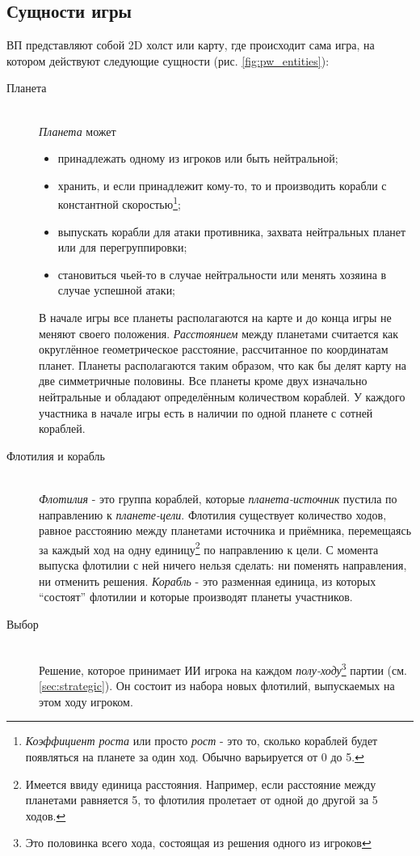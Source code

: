 \documentclass[12pt]{report}
\newenvironment{myItemize}{
	\begin{itemize}
  		\setlength{\itemsep}{1pt}
  		\setlength{\parskip}{0pt}
  		\setlength{\parsep}{0pt}
}{\end{itemize}}
\begin{document}
\subsection{Сущности игры}
ВП представляют собой 2D холст или карту, где происходит сама игра, на котором действуют следующие сущности (рис. \ref{fig:pw_entities}):
\begin{description}
\item[Планета]\hfill \\
	\emph{Планета} может
	\begin{myItemize}
	\item принадлежать одному из игроков или быть нейтральной;
	\item хранить, и если принадлежит кому-то, то и производить корабли с константной скоростью\footnote{\emph{Коэффициент роста} или просто \emph{рост} - это то, сколько кораблей будет появляться на планете за один ход. Обычно варьируется от 0 до 5.};
	\item выпускать корабли для атаки противника, захвата нейтральных планет или для перегруппировки;
	\item становиться чьей-то в случае нейтральности или менять хозяина в случае успешной атаки;	 
	\end{myItemize}
В начале игры все планеты располагаются на карте и до конца игры не меняют своего положения. \emph{Расстоянием} между планетами считается как округлённое геометрическое расстояние, рассчитанное по координатам планет. Планеты располагаются таким образом, что как бы делят карту на две симметричные половины. Все планеты кроме двух изначально нейтральные и обладают определённым количеством кораблей. У каждого участника в начале игры есть в наличии по одной планете с сотней кораблей.
\item[Флотилия и корабль]\hfill \\
\emph{Флотилия} - это группа кораблей, которые \emph{планета-источник} пустила по направлению к \emph{планете-цели}. Флотилия существует количество ходов, равное расстоянию между планетами источника и приёмника, перемещаясь за каждый ход на одну единицу\footnote{Имеется ввиду единица расстояния. Например, если расстояние между планетами равняется 5, то флотилия пролетает от одной до другой за 5 ходов.} по направлению к цели. С момента выпуска флотилии с ней ничего нельзя сделать: ни поменять направления, ни отменить решения. \emph{Корабль} - это разменная единица, из которых ``состоят'' флотилии и которые производят планеты участников.
\item[Выбор]\hfill \\
Решение, которое принимает ИИ игрока на каждом \emph{полу-ходу}\footnote{Это половинка всего хода, состоящая из решения одного из игроков} партии (см. \ref{sec:strategic}). Он состоит из набора новых флотилий, выпускаемых на этом ходу игроком.
\end{description}
\end{document}
